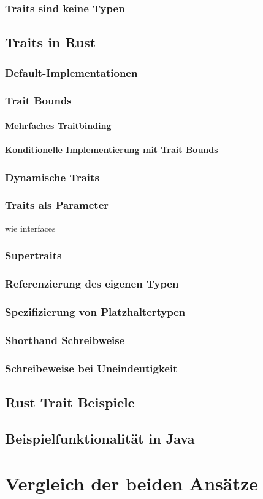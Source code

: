 \documentclass[a4paper, 1ppt]{article}
\begin{document}
\subsubsection{Traits sind keine Typen}
\subsection{Traits in Rust}
\subsubsection{Default-Implementationen}
\subsubsection{Trait Bounds}
\paragraph{Mehrfaches Traitbinding}
\paragraph{Konditionelle Implementierung mit Trait Bounds}
\subsubsection{Dynamische Traits}
\subsubsection{Traits als Parameter}
wie interfaces
\subsubsection{Supertraits}
\subsubsection{Referenzierung des eigenen Typen}
\subsubsection{Spezifizierung von Platzhaltertypen}
\subsubsection{Shorthand Schreibweise}
\subsubsection{Schreibeweise bei Uneindeutigkeit}
\subsection{Rust Trait Beispiele}
\subsection{Beispielfunktionalität in Java}
\section{Vergleich der beiden Ansätze}



\end{document}
